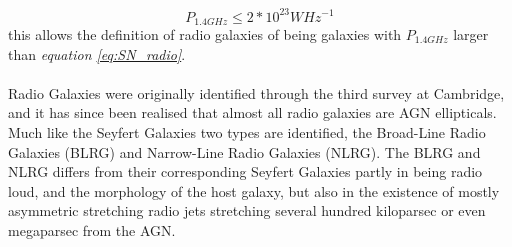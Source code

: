 \documentclass[a4paper, 12pt, twoside]{article}
\begin{document}
\begin{equation}
P_{1.4GHz} \le 2*10^{23} WHz^{-1}
\label{eq:SN_radio}
\end{equation}
this allows the definition of radio galaxies of being galaxies with $P_{1.4GHz}$ larger than \emph{equation \ref{eq:SN_radio}}. \\
\\
Radio Galaxies were originally identified through the third survey at Cambridge, and it has since been realised that almost all radio galaxies are AGN ellipticals. Much like the Seyfert Galaxies two types are identified, the Broad-Line Radio Galaxies (BLRG) and Narrow-Line Radio Galaxies (NLRG). The BLRG and NLRG differs from their corresponding Seyfert Galaxies partly in being radio loud, and the morphology of the host galaxy, but also in the existence of mostly asymmetric stretching radio jets stretching several hundred kiloparsec or even megaparsec from the AGN. \\
\end{document}
